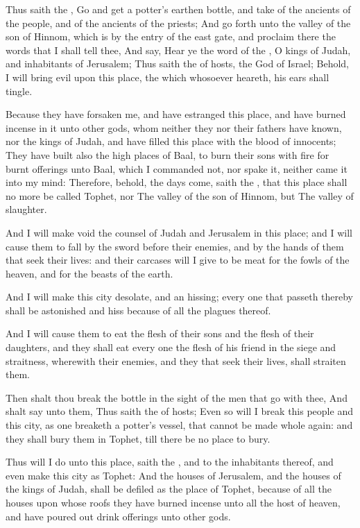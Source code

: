 \Chapter
\Verse Thus saith the \LORD, Go and get a potter's earthen bottle, and take of the ancients of the people, and of the ancients of the priests; \Verse And go forth unto the valley of the son of Hinnom, which is by the entry of the east gate, and proclaim there the words that I shall tell thee, \Verse And say, Hear ye the word of the \LORD, O kings of Judah, and inhabitants of Jerusalem; Thus saith the \LORD of hosts, the God of Israel; Behold, I will bring evil upon this place, the which whosoever heareth, his ears shall tingle.

\Verse Because they have forsaken me, and have estranged this place, and have burned incense in it unto other gods, whom neither they nor their fathers have known, nor the kings of Judah, and have filled this place with the blood of innocents; \Verse They have built also the high places of Baal, to burn their sons with fire for burnt offerings unto Baal, which I commanded not, nor spake it, neither came it into my mind: \Verse Therefore, behold, the days come, saith the \LORD, that this place shall no more be called Tophet, nor The valley of the son of Hinnom, but The valley of slaughter.

\Verse And I will make void the counsel of Judah and Jerusalem in this place; and I will cause them to fall by the sword before their enemies, and by the hands of them that seek their lives: and their carcases will I give to be meat for the fowls of the heaven, and for the beasts of the earth.

\Verse And I will make this city desolate, and an hissing; every one that passeth thereby shall be astonished and hiss because of all the plagues thereof.

\Verse And I will cause them to eat the flesh of their sons and the flesh of their daughters, and they shall eat every one the flesh of his friend in the siege and straitness, wherewith their enemies, and they that seek their lives, shall straiten them.

\Verse Then shalt thou break the bottle in the sight of the men that go with thee, \Verse And shalt say unto them, Thus saith the \LORD of hosts; Even so will I break this people and this city, as one breaketh a potter's vessel, that cannot be made whole again: and they shall bury them in Tophet, till there be no place to bury.

\Verse Thus will I do unto this place, saith the \LORD, and to the inhabitants thereof, and even make this city as Tophet: \Verse And the houses of Jerusalem, and the houses of the kings of Judah, shall be defiled as the place of Tophet, because of all the houses upon whose roofs they have burned incense unto all the host of heaven, and have poured out drink offerings unto other gods.

